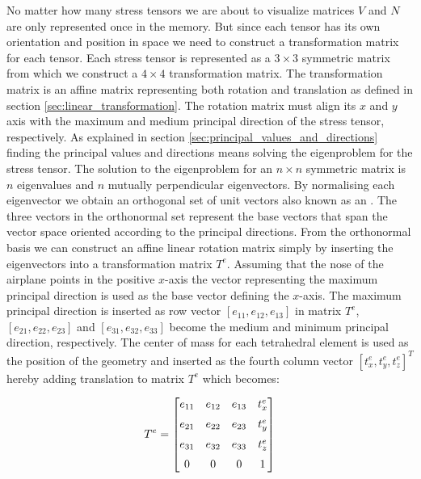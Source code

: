 No matter how many stress tensors we are about to visualize matrices $V$
and $N$ are only represented once in the memory. But since each tensor
has its own orientation and position in space we need to construct a
transformation matrix for each tensor. 
%
Each stress tensor is represented as a $3 \times 3$
symmetric matrix from which we construct a $4 \times 4$ transformation matrix. 
The transformation matrix is an
affine matrix representing both rotation and translation as defined in
section \vref{sec:linear_transformation}.
%
The rotation matrix must align its $x$ and $y$ axis with the
maximum and medium principal direction of the stress tensor, respectively.
As explained in section
\vref{sec:principal_values_and_directions} finding the principal
values and directions means solving the eigenproblem for the stress
tensor. The solution to the
eigenproblem for an $n \times n$ 
symmetric matrix is $n$ eigenvalues and $n$ mutually
perpendicular eigenvectors. By normalising each eigenvector
we obtain an orthogonal set of unit
vectors also known as an . The three vectors in
the orthonormal set represent the base vectors that span the vector
space oriented according to 
the principal directions. From the orthonormal
basis we can construct an affine linear rotation matrix simply by
inserting the eigenvectors into a transformation matrix $T^e$. Assuming
that the nose of the airplane points in the positive $x$-axis the vector
representing the maximum principal direction is used as the 
base vector defining the $x$-axis. The maximum principal direction is
inserted as row vector $[e_{11}, e_{12}, e_{13}]$ in matrix $T^e$,
$[e_{21}, e_{22}, e_{23}]$ and  $[e_{31}, e_{32}, e_{33}]$ become the medium and
minimum principal direction, respectively. The center of mass for each
tetrahedral element is used as the position of the geometry and
inserted as the fourth column vector $[t^e_x, t^e_y, t^e_z]^T$ hereby
adding translation to matrix $T^e$ which becomes: 

\begin{equation}
\label{eq:tensor_transformation_matrix}
T^e = 
\begin{bmatrix} 
e_{11} & e_{12} & e_{13} & t^e_x \vspace{2mm} \\
e_{21} & e_{22} & e_{23} & t^e_y \vspace{2mm} \\
e_{31} & e_{32} & e_{33} & t^e_z \vspace{2mm} \\
0 & 0 & 0 & 1 
\end{bmatrix} 
\end{equation} 

